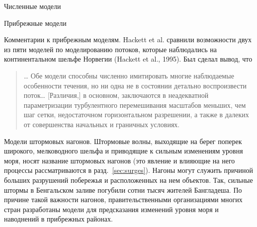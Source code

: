 \begin{chapter}{Численные модели}
\begin{section}{Прибрежные модели}
\begin{paragraph}{Комментарии к прибрежным моделям.}
Hackett et al. сравнили возможности двух из пяти моделей по моделированию
потоков, которые наблюдались на континентальном шельфе Норвегии (Hackett et al., 1995). 
Был сделал вывод, что
%
\begin{quote}
\dots{} Обе модели способны численно имитировать многие наблюдаемые особенности 
течения, но ни одна не в состоянии детально воспроизвести поток\dots{} 
[Различия,] в основном, заключаются в неадекватной параметризации 
турбулентного перемешивания
масштабов меньших, чем шаг сетки, недостаточном горизонтальном
разрешении, а также в далеких от совершенства начальных и граничных условиях.
%
\end{quote}
\end{paragraph}

\begin{paragraph}{Модели штормовых нагонов.}
%
Штормовые волны, выходящие на берег поперек широкого,
мелководного шельфа и приводящие к сильным изменениям уровня моря,
носят название штормовых нагонов (это явление и влияющие на него процессы
рассматриваются в разд.~\ref{sec:surges}). Нагоны могут служить причиной 
больших разрушений побережья и расположенных на нем объектов.
Так, сильные штормы в Бенгальском заливе погубили сотни тысяч
жителей Бангладеша. По причине такой важности нагонов, правительственными
организациями многих стран разработаны модели для предсказания
изменений уровня моря и наводнений в прибрежных районах.
%


\end{paragraph}
\end{section}
\end{chapter}
